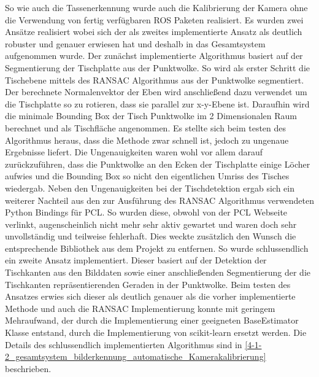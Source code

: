 So wie auch die Tassenerkennung wurde auch die Kalibrierung der Kamera ohne die Verwendung von fertig verfügbaren ROS Paketen realisiert. Es wurden zwei Ansätze realisiert wobei sich der als zweites implementierte Ansatz als deutlich robuster und genauer erwiesen hat und deshalb in das Gesamtsystem aufgenommen wurde.
Der zunächst implementierte Algorithmus basiert auf der Segmentierung der Tischplatte aus der Punktwolke. So wird als erster Schritt die Tischebene mittels des RANSAC Algorithmus aus der Punktwolke segmentiert. Der berechnete Normalenvektor der Eben wird anschließend dazu verwendet um die Tischplatte so zu rotieren, dass sie parallel zur x-y-Ebene ist. Daraufhin wird die minimale Bounding Box der Tisch Punktwolke im 2 Dimensionalen Raum berechnet und als Tischfläche angenommen. Es stellte sich beim testen des Algorithmus heraus, dass die Methode zwar schnell ist, jedoch zu ungenaue Ergebnisse liefert. Die Ungenauigkeiten waren wohl vor allem darauf zurückzuführen, dass die Punktwolke an den Ecken der Tischplatte einige Löcher aufwies und die Bounding Box so nicht den eigentlichen Umriss des Tisches wiedergab. Neben den Ungenauigkeiten bei der Tischdetektion ergab sich ein weiterer Nachteil aus den zur Ausführung des RANSAC Algorithmus verwendeten Python Bindings für PCL. So wurden diese, obwohl von der PCL Webseite verlinkt, augenscheinlich nicht mehr sehr aktiv gewartet und waren doch sehr unvollständig und teilweise fehlerhaft. Dies weckte zusätzlich den Wunsch die entsprechende Bibliothek aus dem Projekt zu entfernen.
So wurde schlussendlich ein zweite Ansatz implementiert. Dieser basiert auf der Detektion der Tischkanten aus den Bilddaten sowie einer anschließenden Segmentierung der die Tischkanten repräsentierenden Geraden in der Punktwolke. Beim testen des Ansatzes erwies sich dieser als deutlich genauer als die vorher implementierte Methode und auch die RANSAC Implementierung konnte mit geringem Mehraufwand, der durch die Implementierung einer geeigneten BaseEstimator Klasse entstand, durch die Implementierung von scikit-learn ersetzt werden. Die Details des schlussendlich implementierten Algorithmus sind in \ref{4-1-2_gesamtsystem_bilderkennung_automatische_Kamerakalibrierung} beschrieben.